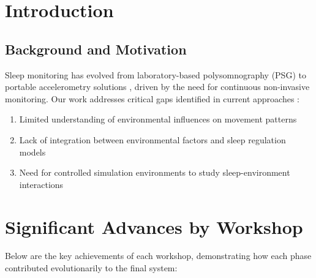 \documentclass[conference]{IEEEtran}
\begin{document}
\section{Introduction}
\subsection{Background and Motivation}
Sleep monitoring has evolved from laboratory-based polysomnography (PSG) to portable accelerometry solutions \cite{AccelerometryReview}, driven by the need for continuous non-invasive monitoring. Our work addresses critical gaps identified in current approaches \cite{Sadeh1994}:
\begin{enumerate}
    \item Limited understanding of environmental influences on movement patterns
    \item Lack of integration between environmental factors and sleep regulation models
    \item Need for controlled simulation environments to study sleep-environment interactions
\end{enumerate}

\section{Significant Advances by Workshop}
Below are the key achievements of each workshop, demonstrating how each phase contributed evolutionarily to the final system:
\end{document}
